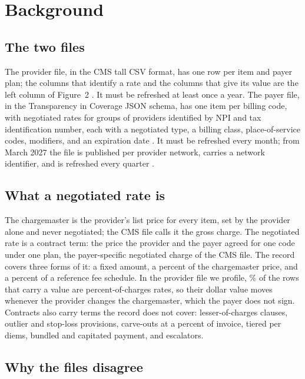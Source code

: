 \documentclass[10pt]{article}
\begin{document}
\section*{Background}

\subsection*{The two files}

The provider file, in the CMS tall CSV format, has one row per item and payer plan; the columns that identify a rate and the columns that give its value are the left column of Figure~2 \cite{hptschema}. It must be refreshed at least once a year. The payer file, in the Transparency in Coverage JSON schema, has one item per billing code, with negotiated rates for groups of providers identified by NPI and tax identification number, each with a negotiated type, a billing class, place-of-service codes, modifiers, and an expiration date \cite{ticschema}. It must be refreshed every month; from March 2027 the file is published per provider network, carries a network identifier, and is refreshed every quarter \cite{tic2026}.

\subsection*{What a negotiated rate is}

The chargemaster is the provider's list price for every item, set by the provider alone and never negotiated; the CMS file calls it the gross charge. The negotiated rate is a contract term: the price the provider and the payer agreed for one code under one plan, the payer-specific negotiated charge of the CMS file. The record covers three forms of it: a fixed amount, a percent of the chargemaster price, and a percent of a reference fee schedule. In the provider file we profile, \sheetPctShare\% of the rows that carry a value are percent-of-charges rates, so their dollar value moves whenever the provider changes the chargemaster, which the payer does not sign. Contracts also carry terms the record does not cover: lesser-of-charges clauses, outlier and stop-loss provisions, carve-outs at a percent of invoice, tiered per diems, bundled and capitated payment, and escalators.

\subsection*{Why the files disagree}
\end{document}
